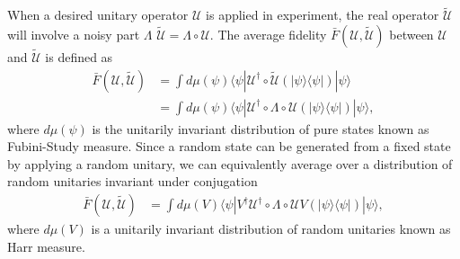 \documentclass[prl,twocolumn,showpacs]{revtex4-1}
\newcommand{\bra}[1]{\langle #1|}
\newcommand{\ket}[1]{|#1\rangle}
\begin{document}
When a desired unitary operator $\mathcal{U}$ is applied in experiment, the real operator $\tilde{\mathcal{U}}$ will involve a noisy part $\Lambda$ $\tilde{\mathcal{U}} = \Lambda \circ \mathcal{U}$. The average fidelity $\bar{F}(\mathcal{U}, \tilde{\mathcal{U}})$ between $\mathcal{U}$ and $\tilde{\mathcal{U}}$ is defined as
\begin{align} \label{average_fidelity}
\bar{F}(\mathcal{U}, \tilde{\mathcal{U}}) &= \int d\mu(\psi) \bra{\psi} \mathcal{U}^{\dagger}\circ \tilde{\mathcal{U}} (\ket{\psi} \bra{\psi}) \ket{\psi} \\
&= \int d\mu(\psi) \bra{\psi} \mathcal{U}^{\dagger}\circ \Lambda \circ \mathcal{U} (\ket{\psi} \bra{\psi}) \ket{\psi},
\end{align}
where $d\mu(\psi)$ is the unitarily invariant distribution of pure states known as Fubini-Study measure\cite{Emerson2005}. Since a random state can be generated from a fixed state by applying a random unitary, we can equivalently average over a distribution of random unitaries invariant under conjugation
\begin{align} \label{average_Harr}
\bar{F}(\mathcal{U}, \tilde{\mathcal{U}}) &= \int d\mu(V) \bra{\psi} V^{\dagger} \mathcal{U}^{\dagger}\circ \Lambda \circ \mathcal{U} V(\ket{\psi} \bra{\psi}) \ket{\psi},
\end{align}
where $d\mu(V)$ is a unitarily invariant distribution of random unitaries known as Harr measure\cite{Emerson2005}.

\end{document}
